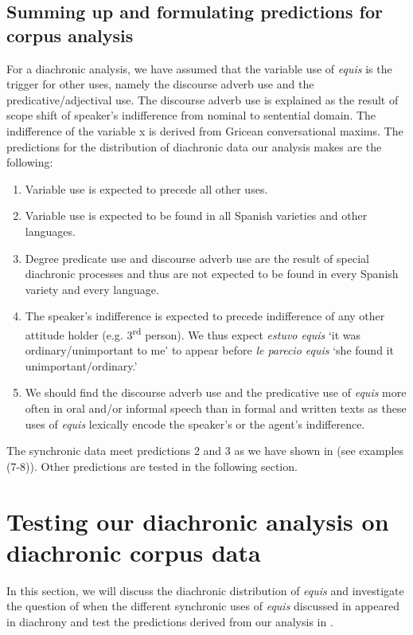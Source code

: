\documentclass[output=paper
,modfonts
,nonflat]{langsci/langscibook}
\begin{document}
\subsection{Summing up and formulating predictions for corpus analysis}\label{sec:kellert:4.3}
For a diachronic analysis, we have assumed that the variable use of \textit{equis} is the trigger for other uses, namely the discourse adverb use and the predicative/adjectival use. The discourse adverb use is explained as the result of scope shift of speaker’s indifference from nominal to sentential domain. The indifference of the variable x is derived from Gricean conversational maxims. The predictions for the distribution of diachronic data our analysis makes are the following:

\begin{enumerate}
	\item Variable use is expected to precede all other uses.
	\item Variable use is expected to be found in all Spanish varieties and other languages.
	\item Degree predicate use and discourse adverb use are the result of special diachronic processes and thus are not expected to be found in every Spanish variety and every language.
	\item The speaker’s indifference is expected to precede indifference of any other attitude holder (e.g. 3\textsuperscript{rd} person). We thus expect \textit{estuvo equis} ‘it was ordinary/unimportant to me’ to appear before \textit{le parecio equis} ‘she found it unimportant/ordinary.’
	\item We should find the discourse adverb use and the predicative use of \textit{equis} more often in oral and/or informal speech than in formal and written texts as these uses of \textit{equis} lexically encode the speaker’s or the agent’s indifference.
\end{enumerate}

The synchronic data meet predictions 2 and 3 as we have shown in  (see examples (7-8)). Other predictions are tested in the following section.

\section{Testing our diachronic analysis on diachronic corpus data}\label{sec:kellert:5}
In this section, we will discuss the diachronic distribution of \textit{equis} and investigate the question of when the different synchronic uses of \textit{equis} discussed in  appeared in diachrony and test the predictions derived from our analysis in .
\end{document}

